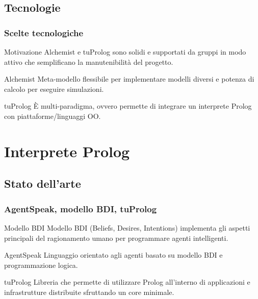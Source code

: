 \documentclass[handout]{beamer}\mode<presentation>{\usetheme{AMSCesenaBleu}}
\begin{document}
\subsection{Tecnologie}
\begin{frame}
\frametitle{Scelte tecnologiche}
\begin{block}{Motivazione}
Alchemist e tuProlog sono solidi e supportati da gruppi in modo attivo che semplificano la manutenibilità del progetto. 
\end{block}

\begin{block}{Alchemist}
Meta-modello flessibile per implementare modelli diversi e potenza di calcolo per eseguire simulazioni.
\end{block}

\begin{block}{tuProlog}
È multi-paradigma, ovvero permette di integrare un interprete Prolog con piattaforme/linguaggi OO.
\end{block}
\end{frame}


\section{Interprete Prolog}

\subsection{Stato dell'arte}

\begin{frame}
\frametitle{AgentSpeak, modello BDI, tuProlog}
\begin{block}{Modello BDI}
Modello BDI (Beliefs, Desires, Intentions) implementa gli aspetti principali del ragionamento umano per programmare agenti intelligenti.
\end{block}
\begin{block}{AgentSpeak}
Linguaggio orientato agli agenti basato su modello BDI e programmazione logica.
\end{block}
\begin{block}{tuProlog}
Libreria che permette di utilizzare Prolog all'interno di applicazioni e infrastrutture distribuite sfruttando un core minimale.
\end{block}

\end{frame}
\end{document}

